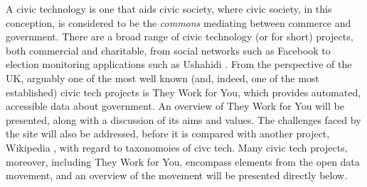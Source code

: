 A civic technology is one that aids civic society, where civic society, in this conception, is considered to be the \emph{commons} mediating between commerce and government.
There are a broad range of civic technology (or  for short) projects, both commercial and charitable, from social networks such as Facebook \cite{facebook} to election monitoring applications such as Ushahidi \cite{ushahidi}. 
From the perspective of the UK, arguably one of the most well known (and, indeed, one of the most established) civic tech projects is They Work for You, which provides automated, accessible data about government. 
An overview of They Work for You will be presented, along with a discussion of its aims and values. 
The challenges faced by the site will also be addressed, before it is compared with another project, Wikipedia \cite{wikipedia}, with regard to taxonomoies of civc tech.
Many civic tech projects, moreover, including They Work for You, encompass elements from the open data movement,
and an overview of the movement will be presented directly below.
